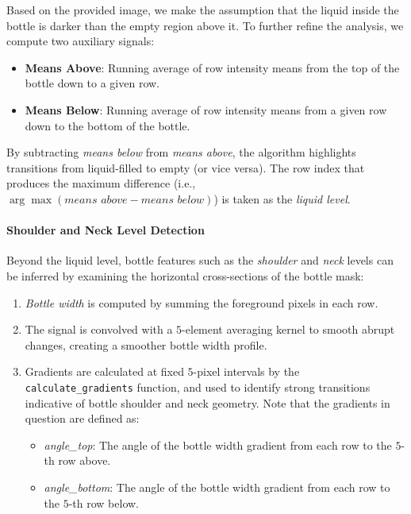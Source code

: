 \documentclass[a4paper,12pt]{article}
\begin{document}
Based on the provided image, we make the assumption that the liquid inside the bottle is darker than the empty region above it. To further refine the analysis, we compute two auxiliary signals:
\begin{itemize}
    \item \textbf{Means Above}: Running average of row intensity means from the top of the bottle down to a given row.
    \item \textbf{Means Below}: Running average of row intensity means from a given row down to the bottom of the bottle.
\end{itemize}
By subtracting \textit{means below} from \textit{means above}, the algorithm highlights transitions from liquid-filled to empty (or vice versa). The row index that produces the maximum difference (i.e., \(\arg\max(\textit{means above} - \textit{means below})\)) is taken as the \emph{liquid level}.

\paragraph{Shoulder and Neck Level Detection}

Beyond the liquid level, bottle features such as the \emph{shoulder} and \emph{neck} levels can be inferred by examining the horizontal cross-sections of the bottle mask:
\begin{enumerate}
    \item \textit{Bottle width} is computed by summing the foreground pixels in each row. 
    \item The signal is convolved with a \(5\)-element averaging kernel to smooth abrupt changes, creating a smoother bottle width profile.
    \item Gradients are calculated at fixed \(5\)-pixel intervals by the \texttt{calculate\_gradients} function, and used to identify strong transitions indicative of bottle shoulder and neck geometry. Note that the gradients in question are defined as:
    \begin{itemize}
        \item \textit{angle\_top}: The angle of the bottle width gradient from each row to the \(5\)-th row above.
        \item \textit{angle\_bottom}: The angle of the bottle width gradient from each row to the \(5\)-th row below.
    \end{itemize}
\end{enumerate}
\end{document}
